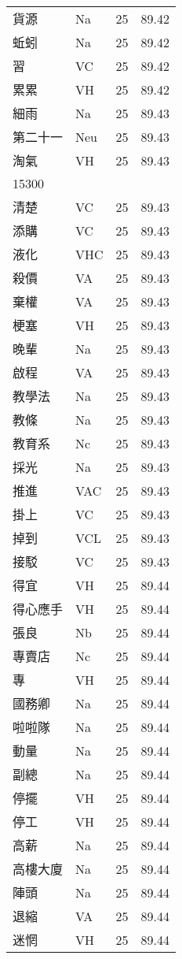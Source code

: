 \documentclass[twocolumn]{book}
\begin{document}
\begin{supertabular}{llrr}
貨源 & Na & 25 &  89.42\\
蚯蚓 & Na & 25 &  89.42\\
習 & VC & 25 &  89.42\\
累累 & VH & 25 &  89.42\\
細雨 & Na & 25 &  89.43\\
第二十一 & Neu & 25 &  89.43\\
淘氣 & VH & 25 &  89.43\\
15300\\
清楚 & VC & 25 &  89.43\\
添購 & VC & 25 &  89.43\\
液化 & VHC & 25 &  89.43\\
殺價 & VA & 25 &  89.43\\
棄權 & VA & 25 &  89.43\\
梗塞 & VH & 25 &  89.43\\
晚輩 & Na & 25 &  89.43\\
啟程 & VA & 25 &  89.43\\
教學法 & Na & 25 &  89.43\\
教條 & Na & 25 &  89.43\\
教育系 & Nc & 25 &  89.43\\
採光 & Na & 25 &  89.43\\
推進 & VAC & 25 &  89.43\\
掛上 & VC & 25 &  89.43\\
掉到 & VCL & 25 &  89.43\\
接駁 & VC & 25 &  89.43\\
得宜 & VH & 25 &  89.44\\
得心應手 & VH & 25 &  89.44\\
張良 & Nb & 25 &  89.44\\
專賣店 & Nc & 25 &  89.44\\
專 & VH & 25 &  89.44\\
國務卿 & Na & 25 &  89.44\\
啦啦隊 & Na & 25 &  89.44\\
動量 & Na & 25 &  89.44\\
副總 & Na & 25 &  89.44\\
停擺 & VH & 25 &  89.44\\
停工 & VH & 25 &  89.44\\
高薪 & Na & 25 &  89.44\\
高樓大廈 & Na & 25 &  89.44\\
陣頭 & Na & 25 &  89.44\\
退縮 & VA & 25 &  89.44\\
迷惘 & VH & 25 &  89.44\\

\end{supertabular}
\end{document}
